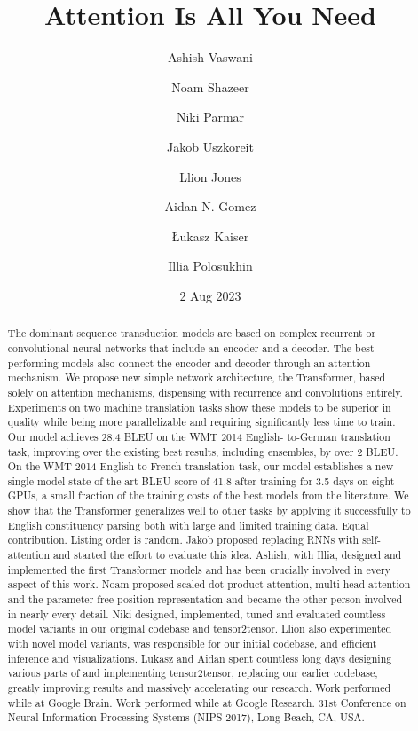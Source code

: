 \documentclass[12pt, a4paper]{article}
\title{Attention Is All You Need}
\author{Ashish Vaswani \and Noam Shazeer \and Niki Parmar \and Jakob Uszkoreit \and Llion Jones \and Aidan N. Gomez \and \L ukasz Kaiser \and Illia Polosukhin}
\date{2 Aug 2023}
\begin{document}
\maketitle

\begin{abstract}
The dominant sequence transduction models are based on complex recurrent or convolutional neural networks that include an encoder and a decoder. The best performing models also connect the encoder and decoder through an attention mechanism. We propose new simple network architecture, the Transformer, based solely on attention mechanisms, dispensing with recurrence and convolutions entirely. Experiments on two machine translation tasks show these models to be superior in quality while being more parallelizable and requiring significantly less time to train. Our model achieves 28.4 BLEU on the WMT 2014 English- to-German translation task, improving over the existing best results, including ensembles, by over 2 BLEU. On the WMT 2014 English-to-French translation task, our model establishes a new single-model state-of-the-art BLEU score of 41.8 after training for 3.5 days on eight GPUs, a small fraction of the training costs of the best models from the literature. We show that the Transformer generalizes well to other tasks by applying it successfully to English constituency parsing both with large and limited training data. Equal contribution. Listing order is random. Jakob proposed replacing RNNs with self-attention and started the effort to evaluate this idea. Ashish, with Illia, designed and implemented the first Transformer models and has been crucially involved in every aspect of this work. Noam proposed scaled dot-product attention, multi-head attention and the parameter-free position representation and became the other person involved in nearly every detail. Niki designed, implemented, tuned and evaluated countless model variants in our original codebase and tensor2tensor. Llion also experimented with novel model variants, was responsible for our initial codebase, and efficient inference and visualizations. Lukasz and Aidan spent countless long days designing various parts of and implementing tensor2tensor, replacing our earlier codebase, greatly improving results and massively accelerating our research. Work performed while at Google Brain. Work performed while at Google Research. 31st Conference on Neural Information Processing Systems (NIPS 2017), Long Beach, CA, USA.
\end{abstract}

\tableofcontents
\newpage
\end{document}
